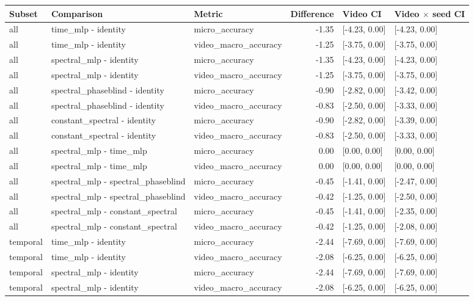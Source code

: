 \begin{tabular}{lllrll}
\toprule
Subset & Comparison & Metric & Difference & Video CI & Video $\times$ seed CI \\
\midrule
all & time\_mlp - identity & micro\_accuracy & -1.35 & [-4.23, 0.00] & [-4.23, 0.00] \\
all & time\_mlp - identity & video\_macro\_accuracy & -1.25 & [-3.75, 0.00] & [-3.75, 0.00] \\
all & spectral\_mlp - identity & micro\_accuracy & -1.35 & [-4.23, 0.00] & [-4.23, 0.00] \\
all & spectral\_mlp - identity & video\_macro\_accuracy & -1.25 & [-3.75, 0.00] & [-3.75, 0.00] \\
all & spectral\_phaseblind - identity & micro\_accuracy & -0.90 & [-2.82, 0.00] & [-3.42, 0.00] \\
all & spectral\_phaseblind - identity & video\_macro\_accuracy & -0.83 & [-2.50, 0.00] & [-3.33, 0.00] \\
all & constant\_spectral - identity & micro\_accuracy & -0.90 & [-2.82, 0.00] & [-3.39, 0.00] \\
all & constant\_spectral - identity & video\_macro\_accuracy & -0.83 & [-2.50, 0.00] & [-3.33, 0.00] \\
all & spectral\_mlp - time\_mlp & micro\_accuracy & 0.00 & [0.00, 0.00] & [0.00, 0.00] \\
all & spectral\_mlp - time\_mlp & video\_macro\_accuracy & 0.00 & [0.00, 0.00] & [0.00, 0.00] \\
all & spectral\_mlp - spectral\_phaseblind & micro\_accuracy & -0.45 & [-1.41, 0.00] & [-2.47, 0.00] \\
all & spectral\_mlp - spectral\_phaseblind & video\_macro\_accuracy & -0.42 & [-1.25, 0.00] & [-2.50, 0.00] \\
all & spectral\_mlp - constant\_spectral & micro\_accuracy & -0.45 & [-1.41, 0.00] & [-2.35, 0.00] \\
all & spectral\_mlp - constant\_spectral & video\_macro\_accuracy & -0.42 & [-1.25, 0.00] & [-2.08, 0.00] \\
temporal & time\_mlp - identity & micro\_accuracy & -2.44 & [-7.69, 0.00] & [-7.69, 0.00] \\
temporal & time\_mlp - identity & video\_macro\_accuracy & -2.08 & [-6.25, 0.00] & [-6.25, 0.00] \\
temporal & spectral\_mlp - identity & micro\_accuracy & -2.44 & [-7.69, 0.00] & [-7.69, 0.00] \\
temporal & spectral\_mlp - identity & video\_macro\_accuracy & -2.08 & [-6.25, 0.00] & [-6.25, 0.00] \\

\end{tabular}
